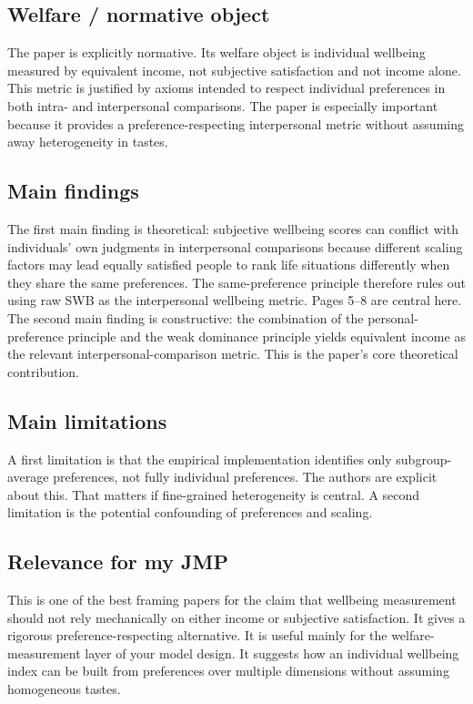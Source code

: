 \documentclass[11pt,a4paper]{article}
\begin{document}
\subsection*{Welfare / normative object}
The paper is explicitly normative. Its welfare object is individual wellbeing measured by equivalent income, not subjective satisfaction and not income alone. This metric is justified by axioms intended to respect individual preferences in both intra- and interpersonal comparisons. The paper is especially important because it provides a preference-respecting interpersonal metric without assuming away heterogeneity in tastes.

\subsection*{Main findings}
The first main finding is theoretical: subjective wellbeing scores can conflict with individuals’ own judgments in interpersonal comparisons because different scaling factors may lead equally satisfied people to rank life situations differently when they share the same preferences. The same-preference principle therefore rules out using raw SWB as the interpersonal wellbeing metric. Pages 5–8 are central here. The second main finding is constructive: the combination of the personal-preference principle and the weak dominance principle yields equivalent income as the relevant interpersonal-comparison metric. This is the paper’s core theoretical contribution.

\subsection*{Main limitations}
A first limitation is that the empirical implementation identifies only subgroup-average preferences, not fully individual preferences. The authors are explicit about this. That matters if fine-grained heterogeneity is central. A second limitation is the potential confounding of preferences and scaling.

\subsection*{Relevance for my JMP}
This is one of the best framing papers for the claim that wellbeing measurement should not rely mechanically on either income or subjective satisfaction. It gives a rigorous preference-respecting alternative. It is useful mainly for the welfare-measurement layer of your model design. It suggests how an individual wellbeing index can be built from preferences over multiple dimensions without assuming homogeneous tastes.
\end{document}
